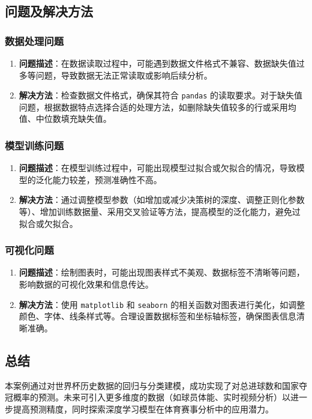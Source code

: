\documentclass[UTF8]{ctexart}
\begin{document}
\subsection{问题及解决方法}
\subsubsection{数据处理问题}
\begin{enumerate}
	\def\labelenumi{\arabic{enumi}.}
	\item
	\textbf{问题描述}：在数据读取过程中，可能遇到数据文件格式不兼容、数据缺失值过多等问题，导致数据无法正常读取或影响后续分析。
	\item
	\textbf{解决方法}：检查数据文件格式，确保其符合 \texttt{pandas} 的读取要求。对于缺失值问题，根据数据特点选择合适的处理方法，如删除缺失值较多的行或采用均值、中位数填充缺失值。
\end{enumerate}

\subsubsection{模型训练问题}
\begin{enumerate}
	\def\labelenumi{\arabic{enumi}.}
	\item
	\textbf{问题描述}：在模型训练过程中，可能出现模型过拟合或欠拟合的情况，导致模型的泛化能力较差，预测准确性不高。
	\item
	\textbf{解决方法}：通过调整模型参数（如增加或减少决策树的深度、调整正则化参数等）、增加训练数据量、采用交叉验证等方法，提高模型的泛化能力，避免过拟合或欠拟合。
\end{enumerate}

\subsubsection{可视化问题}
\begin{enumerate}
	\def\labelenumi{\arabic{enumi}.}
	\item
	\textbf{问题描述}：绘制图表时，可能出现图表样式不美观、数据标签不清晰等问题，影响数据的可视化效果和信息传达。
	\item
	\textbf{解决方法}：使用 \texttt{matplotlib} 和 \texttt{seaborn} 的相关函数对图表进行美化，如调整颜色、字体、线条样式等。合理设置数据标签和坐标轴标签，确保图表信息清晰准确。
\end{enumerate}

\subsection{总结}
本案例通过对世界杯历史数据的回归与分类建模，成功实现了对总进球数和国家夺冠概率的预测。未来可引入更多维度的数据（如球员体能、实时视频分析）以进一步提高预测精度，同时探索深度学习模型在体育赛事分析中的应用潜力。
\end{document}
